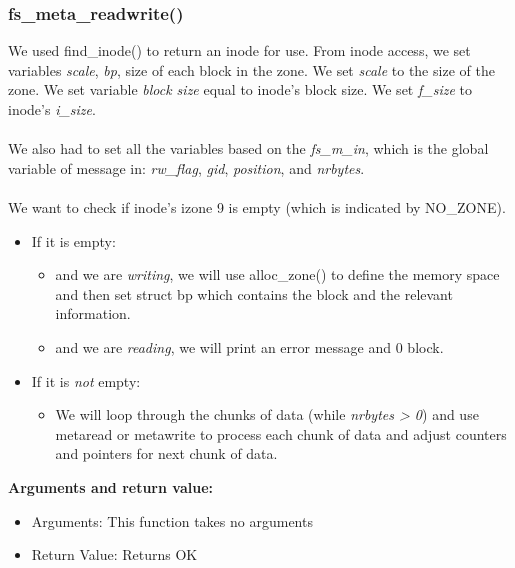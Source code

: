 \documentclass[paper=a4, fontsize=11pt]{scrartcl}
\numberwithin{equation}{section} %
\numberwithin{figure}{section} %
\numberwithin{table}{section} %
\begin{document}
		\subsubsection{fs\_meta\_readwrite()}
		We used find\_inode() to return an inode for use. From inode access, we set variables {\it scale}, {\it bp}, size of each block in the zone. We set {\it scale} to the size of the zone. We set variable {\it block size} equal to inode's block size. We set {\it f\_size} to inode's {\it i\_size}.\\\\
		We also had to set all the variables based on the {\it fs\_m\_in}, which is the global variable of message in: {\it rw\_flag}, {\it gid}, {\it position}, and {\it nrbytes}.\\\\
		We want to check if inode's izone 9 is empty (which is indicated by NO\_ZONE).
		\begin{itemize}
	
		\item If it is empty:
		\begin{itemize}
		\item and we are {\it writing}, we will use alloc\_zone() to define the memory space and then set struct bp which contains the block and the relevant information.
		\item and we are {\it reading}, we will print an error message and 0 block.
		\end{itemize}	
		\item If it is {\it not} empty:
		\begin{itemize}
		\item We will loop through the chunks of data (while {\it nrbytes > 0}) and use metaread or metawrite to process each chunk of data and adjust counters and pointers for next chunk of data.
		\end{itemize}	  
\end{itemize}
{\bf Arguments and return value:}
\begin{itemize}
\item Arguments: This function takes no arguments
\item Return Value: Returns OK
\end{itemize}


		
\end{document}

